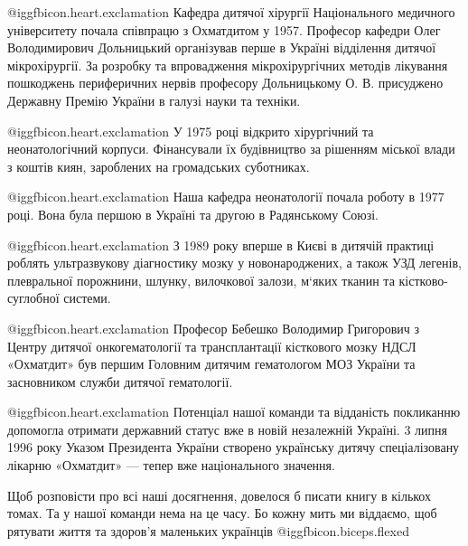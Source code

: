 
@igg{fbicon.heart.exclamation} Кафедра дитячої хірургії Національного медичного
університету почала співпрацю з Охматдитом у 1957. Професор кафедри Олег
Володимирович Дольницький організував перше в Україні відділення дитячої
мікрохірургії. За розробку та впровадження мікрохірургічних методів лікування
пошкоджень периферичних нервів професору Дольницькому О. В. присуджено Державну
Премію України в галузі науки та техніки. 


@igg{fbicon.heart.exclamation} У 1975 році відкрито хірургічний та
неонатологічний корпуси. Фінансували їх будівництво за рішенням міської влади з
коштів киян, зароблених на громадських суботниках.


@igg{fbicon.heart.exclamation} Наша кафедра неонатології почала роботу в 1977
році. Вона була першою в Україні та другою в Радянському Союзі.


@igg{fbicon.heart.exclamation} З 1989 року вперше в Києві в дитячій практиці
роблять ультразвукову діагностику мозку у новонароджених, а також УЗД легенів,
плевральної порожнини, шлунку, вилочкової залози, м‘яких тканин та
кістково-суглобної системи.


@igg{fbicon.heart.exclamation} Професор Бебешко Володимир Григорович з Центру
дитячої онкогематології та трансплантації кісткового мозку НДСЛ «Охматдит» був
першим Головним дитячим гематологом МОЗ України та засновником служби дитячої
гематології. 


@igg{fbicon.heart.exclamation} Потенціал нашої команди та відданість покликанню
допомогла отримати державний статус вже в новій незалежній Україні. 3 липня
1996 року Указом Президента України створено українську дитячу спеціалізовану
лікарню «Охматдит» — тепер вже національного значення.


Щоб розповісти про всі наші досягнення, довелося б писати книгу в кількох
томах. Та у нашої команди нема на це часу. Бо кожну мить ми віддаємо, щоб
рятувати життя та здоров’я маленьких українців @igg{fbicon.biceps.flexed} 

